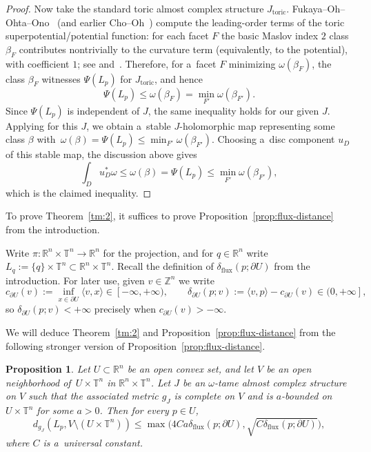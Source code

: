 \documentclass[pdftex]{sigma}
\numberwithin{equation}{section}
\newcommand{\bR}{{\mathbb R}}
\newcommand{\bZ}{{\mathbb Z}}
\newcommand{\bT}{{\mathbb T}}
\newtheorem{Proposition}[Theorem]{Proposition}
\theoremstyle{definition}
\begin{document}
\begin{proof}
Now take the standard toric almost complex structure $J_{\mathrm{toric}}$.
Fukaya--Oh--Ohta--Ono~\cite{FOOO_Toric1} (and earlier Cho--Oh~\cite{ChoOhToric}) compute the leading-order terms of the toric superpotential/potential function: for each facet $F$ the basic Maslov index $2$ class $\beta_F$ contributes nontrivially to the curvature term (equivalently, to the potential), with coefficient $1$; see \cite[Section~11]{FOOO_Toric1} and~\cite{ChoOhToric}.
Therefore, for a~facet $F$ minimizing $\omega(\beta_F)$, the class $\beta_F$ witnesses $\Psi(L_p)$ for $J_{\mathrm{toric}}$, and hence
\[
\Psi(L_p) \le \omega(\beta_F) = \min_{F'}\omega(\beta_{F'}).
\]
Since $\Psi(L_p)$ is independent of $J$, the same inequality holds for our given $J$.
Applying \cite[Theorem~4.8]{STVFluxShape} for this $J$, we obtain a~stable $J$-holomorphic map representing some class $\beta$ with~${\omega(\beta)=\Psi(L_p)\le \min_{F'}\omega(\beta_{F'})}$.
Choosing a~disc component $u_D$ of this stable map, the discussion above gives
\[
\int_D u_D^*\omega\le \omega(\beta)=\Psi(L_p)\le \min_{F'}\omega(\beta_{F'}),
\]
which is the claimed inequality.
\end{proof}

To prove Theorem~\ref{tm:2}, it suffices to prove Proposition~\ref{prop:flux-distance} from the introduction.

Write $\pi\colon \bR^{n}\times\bT^{n}\to \bR^{n}$ for the projection, and for $q\in\bR^n$ write $L_q:=\{q\}\times\bT^n\subset \bR^n\times\bT^n$.
Recall the definition of $\delta_{\mathrm{flux}}(p;\partial U)$ from the introduction.
For later use, given $v\in\bZ^n$ we write
\[
c_{\partial U}(v):=\inf_{x\in \partial U}\langle v,x\rangle\in[-\infty,+\infty),
\qquad
\delta_{\partial U}(p;v):=\langle v,p\rangle-c_{\partial U}(v)\in(0,+\infty],
\]
so $\delta_{\partial U}(p;v)<+\infty$ precisely when $c_{\partial U}(v)>-\infty$.

We will deduce Theorem~\ref{tm:2} and Proposition~\ref{prop:flux-distance} from the following stronger version of Proposition~\ref{prop:flux-distance}.

\begin{Proposition}\label{prop:flux-distance-strong}
Let $U\subset\bR^n$ be an open convex set, and let $V$ be an open neighborhood of~${U\times\bT^n}$ in $\bR^n\times\bT^n$. Let $J$ be an $\omega$-tame almost complex structure on $V$ such that the associated metric $g_J$ is complete on $V$ and is $a$-bounded on $U\times\bT^n$ for some $a>0$. Then for every $p\in U$,
\[
 d_{g_J}(L_p, V\setminus (U\times\bT^n)) \le\max\bigl(4Ca\delta_{\mathrm{flux}}(p;\partial U),\sqrt{C\delta_{\mathrm{flux}}(p;\partial U)}\bigr),
\]
where $C$ is a~universal constant.
\end{Proposition}
\end{document}
